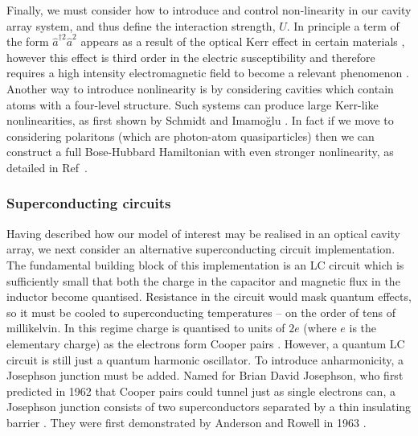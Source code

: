 Finally, we must consider how to introduce and control non-linearity in our cavity array system, and thus define the interaction strength, \(U\). In principle a term of the form \(\hat{a}^{\dagger 2}\hat{a}^{2}\) appears as a result of the optical Kerr effect in certain materials \cite{Kitagawa1986}, however this effect is third order in the electric susceptibility and therefore requires a high intensity electromagnetic field to become a relevant phenomenon \cite{Boyd_KerrNL}. Another way to introduce nonlinearity is by considering cavities which contain atoms with a four-level structure. Such systems can produce large Kerr-like nonlinearities, as first shown by Schmidt and Imamo\u{g}lu \cite{Schmidt1996}. In fact if we move to considering polaritons (which are photon-atom quasiparticles) then we can construct a full Bose-Hubbard Hamiltonian with even stronger nonlinearity, as detailed in Ref~\cite{Hartmann2008}.

\subsubsection{Superconducting circuits}
Having described how our model of interest may be realised in an optical cavity array, we next consider an alternative superconducting circuit implementation. The fundamental building block of this implementation is an LC circuit which is sufficiently small that both the charge in the capacitor and magnetic flux in the inductor become quantised. Resistance in the circuit would mask quantum effects, so it must be cooled to superconducting temperatures -- on the order of tens of millikelvin. In this regime charge is quantised to units of \(2e\) (where \(e\) is the elementary charge) as the electrons form Cooper pairs \cite{Vool2017,Cooper1956}. However, a quantum LC circuit is still just a quantum harmonic oscillator. To introduce anharmonicity, a Josephson junction must be added. Named for Brian David Josephson, who first predicted in 1962 that Cooper pairs could tunnel just as single electrons can, a Josephson junction consists of two superconductors separated by a thin insulating barrier \cite{Josephson1962,Schoelkopf2008}. They were first demonstrated by Anderson and Rowell in 1963 \cite{Anderson1963}. 

